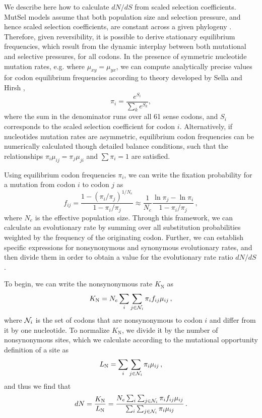 \documentclass{pnastwo}
\begin{document}
\begin{article}
We describe here how to calculate $dN/dS$ from scaled selection coefficients. MutSel models assume that both population size and selection pressure, and hence scaled selection coefficients, are constant across a given phylogeny \cite{HalpernBruno1998,YangNielsen2008,Thorne2012}. Therefore, given reversibility, it is possible to derive stationary equilibrium frequencies, which result from the dynamic interplay between both mutational and selective pressures, for all codons. In the presence of symmetric nucleotide mutation rates, e.g. where $\mu_{xy} = \mu_{yx}$, we can compute analytically precise values for codon equilibrium frequencies according to theory developed by Sella and Hirsh \cite{SellaHirsh2005}, \begin{equation} \pi_i=\frac{e^{S_i}}{\sum_k e^{S_k}}, \end{equation} where the sum in the denominator runs over all 61 sense codons, and $S_i$ corresponds to the scaled selection coefficient for codon $i$. Alternatively, if nucleotides mutation rates are asymmetric, equilibrium codon frequencies can be numerically calculated though detailed balance conditions, such that the relationships 
 $\pi_i\mu_{ij} = \pi_j\mu_{ji}$ and $\sum\pi_i = 1$ are satisfied.
 
Using equilibrium codon frequencies $\pi_i$, we can write the fixation probability for a mutation from codon $i$ to codon $j$ as \cite{HalpernBruno1998,SellaHirsh2005}
\begin{equation}\label{eq:f_ij}
 f_{ij} = \frac{1-(\pi_i/\pi_j)^{1/N_e}}{1-\pi_i/\pi_j}
  \approx \frac{1}{N_e} \frac{\ln \pi_j - \ln \pi_i}{1-\pi_i/\pi_j}\,,
\end{equation}
where $N_e$ is the effective population size. Through this framework, we can calculate an evolutionary rate by summing over all substitution probabilities weighted by the frequency of the originating codon. Further, we can establish specific expressions for nonsynonymous and synonymous evolutionary rates, and then divide them in order to obtain a value for the evolutionary rate ratio $dN/dS$.

To begin, we can write the nonsynonymous rate $K_\text{N}$ as 
\begin{equation}\label{eq:KN}
  K_\text{N} = N_e \sum_i \sum_{j \in {\cal N}_i} \pi_i  f_{ij}\mu_{ij}\,,
\end{equation}
where ${\cal N}_i$ is the set of codons that are nonsynonymous to codon $i$ and differ from it by one nucleotide. To normalize $K_\text{N}$, we divide it by the number of nonsynonymous sites, which we calculate according to the mutational opportunity definition of a site \cite{GoldmanYang1994, Yang2006} as 
\begin{equation}\label{eq:LN}
  L_\text{N} = \sum_i \sum_{j \in {\cal N}_i} \pi_i \mu_{ij}\,, 
\end{equation} and thus we find that 
\begin{equation}\label{eq:dN}
  dN = \frac{K_\text{N}}{L_\text{N}}=\frac{ N_e \sum_i \sum_{j \in {\cal N}_i} \pi_i f_{ij} \mu_{ij} } {\sum_i \sum_{j \in {\cal N}_i} \pi_i \mu_{ij} }\,.
\end{equation}


\end{article}
\end{document}
